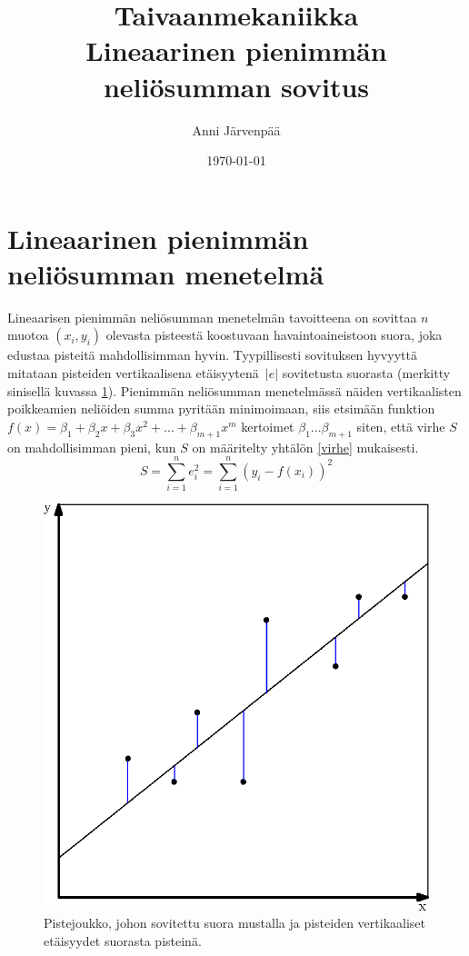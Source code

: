 \documentclass[12pt,a4paper,titlepage]{article}
\title{Taivaanmekaniikka \\ Lineaarinen pienimmän neliösumman sovitus \vspace{0.5em}}
\author{\begin{tabular}{c}
Anni Järvenpää
\end{tabular}}
\date{\today}
\begin{document}
\maketitle

\newpage
\null
\thispagestyle{empty}
\addtocounter{page}{-1}
\newpage

\section{Lineaarinen pienimmän neliösumman menetelmä}
Lineaarisen pienimmän neliösumman menetelmän tavoitteena on sovittaa $n$ muotoa $(x_i, y_i)$ olevasta pisteestä koostuvaan havaintoaineistoon suora, joka edustaa pisteitä mahdollisimman hyvin. Tyypillisesti sovituksen hyvyyttä mitataan pisteiden vertikaalisena etäi\-syytenä~$|e|$ sovitetusta suorasta (merkitty sinisellä kuvassa \ref{vertikaalietaisyys}). Pienimmän neliösumman menetelmässä näiden vertikaalisten poikkeamien neliöiden summa pyritään minimoimaan, siis etsimään funktion $f(x) = \beta_1 + \beta_2 x + \beta_3 x^2 + ... + \beta_{m+1} x^m$ kertoimet $\beta_1 ... \beta_{m+1}$ siten, että virhe $S$ on mahdollisimman pieni, kun $S$ on määritelty yhtälön \ref{virhe} mukaisesti.~\cite{basicideas}
\begin{equation} \label{virhe}
	S = \sum\limits_{i=1}^{n} e_i^2 = \sum\limits_{i=1}^{n} (y_i - f(x_i))^2
\end{equation}

\begin{figure}
\centering
\includegraphics{vertikaalietaisyys.eps}
\caption{Pistejoukko, johon sovitettu suora mustalla ja pisteiden vertikaaliset etäisyydet suorasta pisteinä.}
\label{vertikaalietaisyys}
\end{figure}
\end{document}
